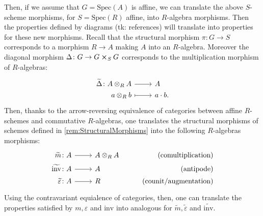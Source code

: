\documentclass[../Main]{subfiles}
\begin{document}
\begin{rem}[]
	Then, if we assume that $G = \mathrm{Spec}(A)$ is affine, we can translate the above $S$-scheme
	morphisms, for $S = \mathrm{Spec}(R)$ affine, into $R$-algebra morphisms.
	Then the properties defined by diagrams (tk: references) will translate into properties
	for these new morphisms.
	Recall that the structural morphism $\pi\colon G \to S$ corresponds to a
	morphism $R \to A$ making $A$ into an $R$-algebra.
	Moreover the diagonal morphism $\Delta\colon G \to G \cross_{ S } G$ corresponds
	to the multiplication morphism of $R$-algebras:
	\begin{equation}
	\begin{tikzcd}[row sep = 0ex
		,/tikz/column 1/.append style={anchor=base east}
		,/tikz/column 2/.append style={anchor=base west}]
		\widetilde{\Delta}\colon A \otimes_R A \arrow[r, "", rightarrow] &
		A \\
		a \otimes_R b \arrow[r, "", mapsto] & a \cdot b
	.\end{tikzcd}
	\end{equation} 
	Then, thanks to the arrow-reversing equivalence of categories between
	affine $R$-schemes and commutative $R$-algebras, one translates the structural morphisms
	of schemes defined in \ref{rem:StructuralMorphisms} into the following $R$-algebras morphisms:
	\begin{equation}
			\begin{tikzcd}[row sep = 0ex
         ,/tikz/column 1/.append style={anchor=base east}
         ,/tikz/column 2/.append style={anchor=base west}
         ,/tikz/column 3/.append style={anchor=base east}]
			\widetilde{m}\colon A \arrow[r, "", rightarrow] &
			A \otimes_R A & \text{(comultiplication)} \\
			\widetilde{\mathrm{inv}}\colon A \arrow[r, "", rightarrow] &
			A & \text{(antipode)} \\
			\widetilde{\varepsilon} \colon A \arrow[r, "", rightarrow] &
			R & \text{(counit/augmentation)} 
		\end{tikzcd}
	\end{equation} 
	Using the contravariant equialence of categories, then,
	one can translate the properties satisfied by $m, \varepsilon$ and $\mathrm{inv}$
	into analogous for $\widetilde{m}, \widetilde{\varepsilon}$ and $\widetilde{\mathrm{inv}}$.
\end{rem}
\end{document}

